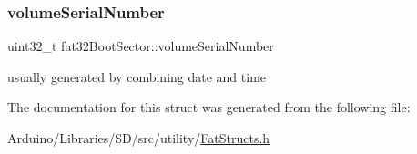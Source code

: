 \subsubsection{\texorpdfstring{volume\+Serial\+Number}{volumeSerialNumber}}
{\footnotesize\ttfamily uint32\+\_\+t fat32\+Boot\+Sector\+::volume\+Serial\+Number}

usually generated by combining date and time 

The documentation for this struct was generated from the following file\+:\begin{DoxyCompactItemize}
\item 
Arduino/\+Libraries/\+S\+D/src/utility/\hyperlink{_fat_structs_8h}{Fat\+Structs.\+h}\end{DoxyCompactItemize}
